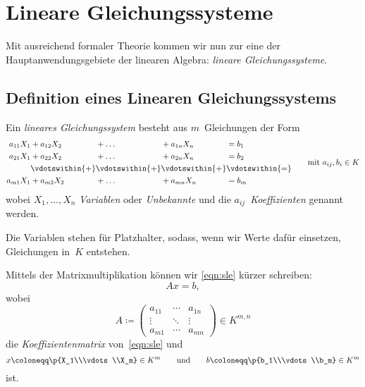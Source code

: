 \documentclass[a4paper]{article}
\begin{document}
\section{Lineare Gleichungssysteme}

Mit ausreichend formaler Theorie kommen wir nun zur eine der Hauptanwendungsgebiete der linearen Algebra: \emph{lineare Gleichungssysteme}.

\subsection{Definition eines Linearen Gleichungssystems}

\begin{definition}
    Ein \emph{lineares Gleichungssystem} besteht aus $m$~Gleichungen der Form
    \begin{equation}
        \begin{alignedat}{4}
            a_{11}X_1 &+ a_{12}X_2 &&+ \dots &&+ a_{1n}X_n &&= b_1 \\
            a_{21}X_1 &+ a_{22}X_2 &&+ \dots &&+ a_{2n}X_n &&= b_2 \\
            &\vdotswithin{+} &&\vdotswithin{+} &&\vdotswithin{+} &&\vdotswithin{=} \\
            a_{m1}X_1 &+ a_{m2}X_2 &&+ \dots &&+ a_{mn}X_n &&= b_m \\
        \end{alignedat}
        \qquad\text{mit } a_{ij},b_i \in K \label{eqn:sle}
    \end{equation}
    wobei $X_1,\dots,X_n$ \emph{Variablen} oder \emph{Unbekannte} und die $a_{ij}$~\emph{Koeffizienten} genannt werden.
\end{definition}

Die Variablen stehen für Platzhalter, sodass, wenn wir Werte dafür einsetzen, Gleichungen in~$K$ entstehen.

\begin{definition}
    Mittels der Matrixmultiplikation können wir \cref{eqn:sle} kürzer schreiben:
    \begin{equation*}
        Ax = b,
    \end{equation*}
    wobei
    \begin{equation*}
        A \coloneqq \begin{pmatrix}
            a_{11} & \cdots & a_{1n} \\
            \vdots & \ddots & \vdots \\
            a_{m1} & \cdots & a_{mn}
        \end{pmatrix} \in K^{m,n}
    \end{equation*}
    die \emph{Koeffizientenmatrix} von~\cref{eqn:sle} und
    \begin{equation*}
        x \coloneqq \p{X_1\\\vdots\\X_m} \in K^m \qquad\text{und}\qquad b \coloneqq \p{b_1\\\vdots\\b_m} \in K^m
    \end{equation*}
    ist.
\end{definition}
\end{document}
